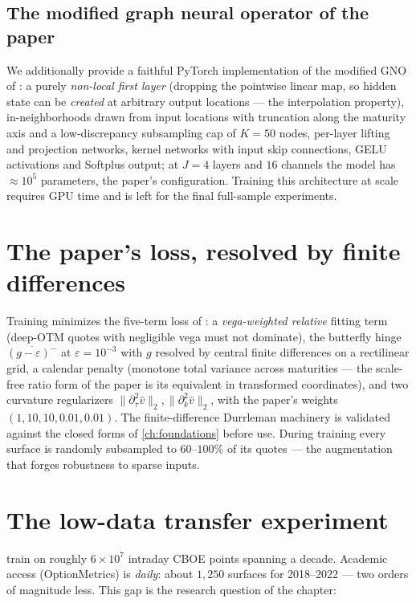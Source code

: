 \subsection{The modified graph neural operator of the paper}
We additionally provide a faithful PyTorch implementation of the modified
GNO of \cite{gonon2024operator}: a purely \emph{non-local first layer}
(dropping the pointwise linear map, so hidden state can be \emph{created} at
arbitrary output locations --- the interpolation property), in-neighborhoods
drawn from input locations with truncation along the maturity axis and a
low-discrepancy subsampling cap of $K=50$ nodes, per-layer lifting and
projection networks, kernel networks with input skip connections, GELU
activations and Softplus output; at $J=4$ layers and $16$ channels the model
has $\approx10^5$ parameters, the paper's configuration. Training this
architecture at scale requires GPU time and is left for the final
full-sample experiments. 

\section{The paper's loss, resolved by finite differences}
Training minimizes the five-term loss of \cite{gonon2024operator}: a
\emph{vega-weighted relative} fitting term (deep-OTM quotes with negligible
vega must not dominate), the butterfly hinge
$\overline{(g-\varepsilon)^-}$ at $\varepsilon=10^{-3}$ with $g$ resolved by
central finite differences on a rectilinear grid, a calendar penalty
(monotone total variance across maturities --- the scale-free ratio form of
the paper is its equivalent in transformed coordinates), and two curvature
regularizers $\|\partial^2_\tau\hat v\|_2,\|\partial^2_k\hat v\|_2$, with the
paper's weights $(1,10,10,0.01,0.01)$. The finite-difference Durrleman
machinery is validated against the closed forms of \cref{ch:foundations}
before use. During training every surface is randomly subsampled to
$60$--$100\%$ of its quotes --- the augmentation that forges robustness to
sparse inputs.

\section{The low-data transfer experiment}
\label{sec:transfer}

\cite{gonon2024operator} train on roughly $6\times10^{7}$ intraday CBOE
points spanning a decade. Academic access (OptionMetrics) is \emph{daily}:
about $1{,}250$ surfaces for 2018--2022 --- two orders of magnitude less.
This gap is the research question of the chapter:

